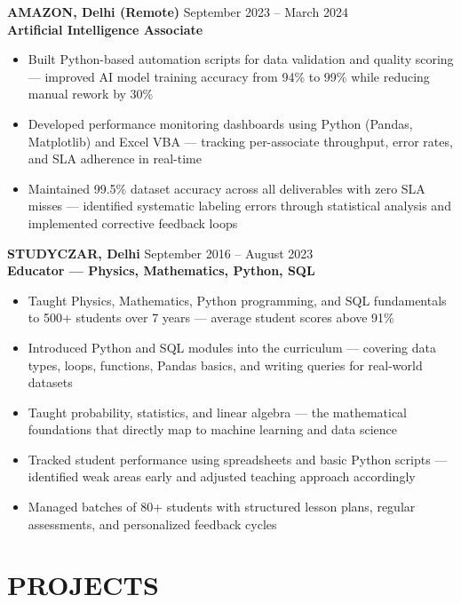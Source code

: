 \documentclass[10.5pt,a4paper]{article}
\begin{document}
\vspace{4pt}
{\textbf{AMAZON, Delhi (Remote)} \hfill {\small\color{subtext} September 2023 -- March 2024}}\\
{\color{accent}\textbf{Artificial Intelligence Associate}}
\begin{itemize}
\item Built Python-based automation scripts for data validation and quality scoring --- improved AI model training accuracy from 94\% to 99\% while reducing manual rework by 30\%
\item Developed performance monitoring dashboards using Python (Pandas, Matplotlib) and Excel VBA --- tracking per-associate throughput, error rates, and SLA adherence in real-time
\item Maintained 99.5\% dataset accuracy across all deliverables with zero SLA misses --- identified systematic labeling errors through statistical analysis and implemented corrective feedback loops
\end{itemize}

\vspace{4pt}
\newpage
{\textbf{STUDYCZAR, Delhi} \hfill {\small\color{subtext} September 2016 -- August 2023}}\\
{\color{accent}\textbf{Educator --- Physics, Mathematics, Python, SQL}}
\begin{itemize}
\item Taught Physics, Mathematics, Python programming, and SQL fundamentals to 500+ students over 7 years --- average student scores above 91\%
\item Introduced Python and SQL modules into the curriculum --- covering data types, loops, functions, Pandas basics, and writing queries for real-world datasets
\item Taught probability, statistics, and linear algebra --- the mathematical foundations that directly map to machine learning and data science
\item Tracked student performance using spreadsheets and basic Python scripts --- identified weak areas early and adjusted teaching approach accordingly
\item Managed batches of 80+ students with structured lesson plans, regular assessments, and personalized feedback cycles
\end{itemize}

\section*{PROJECTS}
\end{document}
